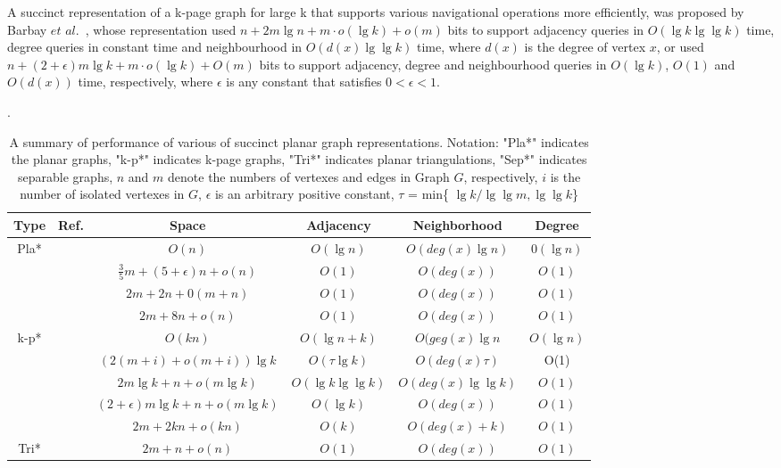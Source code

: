 \documentclass[12pt,glossary]{dalthesis}
\begin{document}
\bigskip
\bigskip

A succinct representation of a k-page graph for large k that supports various navigational operations more efficiently, was proposed by Barbay $et$ $al.$~\cite{Barbay}, whose representation used $n+2m\lg n + m \cdot o(\lg k) + o(m)$ bits to support adjacency queries in $O(\lg k \lg \lg k)$ time, degree queries in constant time and neighbourhood in $O(d(x) \lg \lg k)$ time, where $d(x)$ is the degree of vertex $x$, or used $n+(2+\epsilon)m\lg k + m \cdot o(\lg k) + O(m)$ bits to support adjacency, degree and neighbourhood queries in $O(\lg k)$, $O(1)$ and $O(d(x))$ time, respectively, where $\epsilon$ is any constant that satisfies $0< \epsilon <1$.   

\bigskip

\begin{table}[ht]
\small
\centering
\caption{A summary of performance of various of succinct planar graph representations. Notation: "Pla*" indicates the planar graphs, "k-p*" indicates k-page graphs, "Tri*" indicates planar triangulations, "Sep*" indicates separable graphs, $n$ and $m$ denote the numbers of vertexes and edges in Graph $G$, respectively, $i$ is the number of isolated vertexes in $G$, $\epsilon$ is an arbitrary positive constant, $\tau$ = min\{ $\lg k / \lg \lg m, \lg \lg k$\} }. 
\label{my-label}
\begin{tabular}{|c|c|c|c|c|c|}
\hline
Type                       & Ref. & Space & Adjacency & Neighborhood & Degree \\ \hline
\multirow{4}{*}{Pla*}    &  ~\cite{Jacobson}    & $O(n)$ &   $O(\lg n)$   &       $O(deg(x) \lg n)$       &    $0(\lg n)$    \\ \cline{2-6} 
                           &   ~\cite{Chuang} &  $\frac{3}{5} m + (5+ \epsilon )n + o(n) $  & $O(1)$  & $O(deg(x))$ &   $O(1)$     \\ \cline{2-6} 
                           & ~\cite{Chiang} & $2m+2n+0(m+n)$& $O(1)$  &  $O(deg(x))$  &  $O(1)$     \\ \cline{2-6} 
                           & ~\cite{Munro} & $2m+8n+o(n)$&  $O(1)$  &  $O(deg(x))$  &   $O(1)$  \\ \hline
\multirow{5}{*}{k-p*}    &  ~\cite{Jacobson} &  $O(kn)$  & $O(\lg n + k)$  &  $O(geg(x)\lg n$  &  $O(\lg n)$ \\ \cline{2-6} 
                           &   ~\cite{Gavoille}   & $(2(m+i)+o(m+i))\lg k$ & $O(\tau \lg k)$  &  $O(deg(x) \tau)$ & O(1) \\ \cline{2-6} 
                           &  ~\cite{Barbay} & $2m \lg k+n+o(m \lg k)$  & $O(\lg k \lg \lg k)$  & $O(deg(x) \lg \lg k)$ &   $O(1)$  \\ \cline{2-6} 
                           &   ~\cite{Barbay}   & $(2+\epsilon )m\lg k+n+o(m\lg k)$ & $O(\lg k)$ & $O(deg(x))$& $O(1)$        \\ \cline{2-6} 
                           &~\cite{Munro} & $2m+2kn+o(kn)$ & $O(k)$  & $O(deg(x)+k)$ &  $O(1)$  \\ \hline
\multirow{1}{*}{Tri*} &  ~\cite{Chuang}    & $2m+n+o(n)$  & $O(1)$      & $O(deg(x))$    & $O(1)$   \\ \hline
                           

\end{tabular}
\end{table}
\end{document}
